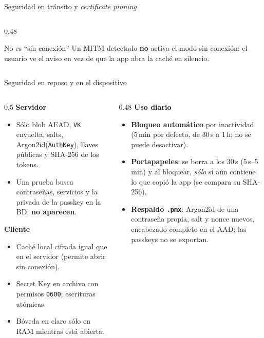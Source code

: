 \documentclass[aspectratio=169,10pt]{beamer}
\newcommand{\key}[1]{\textcolor{cripto}{\texttt{#1}}}
\begin{document}
\begin{frame}{Seguridad en tránsito y \emph{certificate pinning}}
\begin{columns}[T]
\begin{column}{0.48\textwidth}
      \vspace{2mm}
      \begin{block}{\scriptsize No es ``sin conexión''}
        \scriptsize Un MITM detectado \textbf{no} activa el modo sin conexión: el usuario ve el
        aviso en vez de que la app abra la caché en silencio.
      \end{block}
    \end{column}
  \end{columns}
\end{frame}

\begin{frame}{Seguridad en reposo y en el dispositivo}
  \begin{columns}[T]
    \begin{column}{0.5\textwidth}
      \small
      \textbf{Servidor}
      \begin{itemize}\footnotesize
        \item Sólo blob AEAD, \key{VK} envuelta, salts, Argon2id(\key{AuthKey}), llaves públicas
              y SHA-256 de los tokens.
        \item Una prueba busca contraseñas, servicios y la privada de la passkey en la BD:
              \textbf{no aparecen}.
      \end{itemize}
      \textbf{Cliente}
      \begin{itemize}\footnotesize
        \item Caché local cifrada igual que en el servidor (permite abrir sin conexión).
        \item Secret Key en archivo con permisos \texttt{0600}; escrituras atómicas.
        \item Bóveda en claro sólo en RAM mientras está abierta.
      \end{itemize}
    \end{column}
    \begin{column}{0.48\textwidth}
      \small
      \textbf{Uso diario}
      \begin{itemize}\footnotesize
        \item \textbf{Bloqueo automático} por inactividad (5\,min por defecto, de 30\,s a 1\,h;
              no se puede desactivar).
        \item \textbf{Portapapeles}: se borra a los 30\,s (5\,s--5\,min) y al bloquear,
              \emph{sólo} si aún contiene lo que copió la app (se compara su SHA-256).
        \item \textbf{Respaldo \texttt{.pmx}}: Argon2id de una contraseña propia, salt y nonce
              nuevos, encabezado completo en el AAD; las passkeys no se exportan.
      \end{itemize}
    \end{column}
  \end{columns}
\end{frame}
\end{document}
